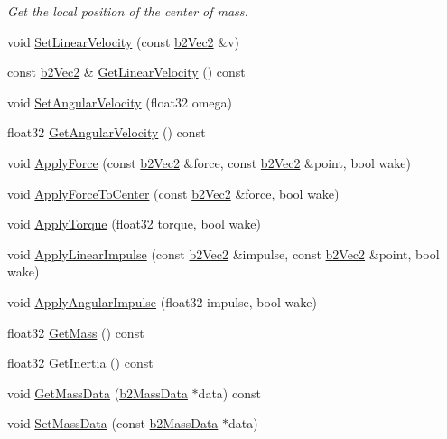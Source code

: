 \begin{DoxyCompactItemize}
\begin{DoxyCompactList}\small\item\em Get the local position of the center of mass. \end{DoxyCompactList}\item 
void \hyperlink{classb2_body_a832f3989a44f0d4782c80456832197ad}{Set\+Linear\+Velocity} (const \hyperlink{structb2_vec2}{b2\+Vec2} \&v)
\item 
const \hyperlink{structb2_vec2}{b2\+Vec2} \& \hyperlink{classb2_body_a427cf835b5d3327a003ff43cb6107ead}{Get\+Linear\+Velocity} () const 
\item 
void \hyperlink{classb2_body_a37adc4160b84f73e8552a91cbde3f578}{Set\+Angular\+Velocity} (float32 omega)
\item 
float32 \hyperlink{classb2_body_a158fe4c141168d2c3e65096b209f548c}{Get\+Angular\+Velocity} () const 
\item 
void \hyperlink{classb2_body_a942be8e1cd2bcd06f53c4638c45a9525}{Apply\+Force} (const \hyperlink{structb2_vec2}{b2\+Vec2} \&force, const \hyperlink{structb2_vec2}{b2\+Vec2} \&point, bool wake)
\item 
void \hyperlink{classb2_body_abeba04911f7a2a141169bb06fe98d06a}{Apply\+Force\+To\+Center} (const \hyperlink{structb2_vec2}{b2\+Vec2} \&force, bool wake)
\item 
void \hyperlink{classb2_body_a54a354447ac3b4cc224c8327a5abc0e8}{Apply\+Torque} (float32 torque, bool wake)
\item 
void \hyperlink{classb2_body_a7f677e93efb3c4c065087aff317274a3}{Apply\+Linear\+Impulse} (const \hyperlink{structb2_vec2}{b2\+Vec2} \&impulse, const \hyperlink{structb2_vec2}{b2\+Vec2} \&point, bool wake)
\item 
void \hyperlink{classb2_body_a65384cfad8db2376cdf3fab38cac06e5}{Apply\+Angular\+Impulse} (float32 impulse, bool wake)
\item 
float32 \hyperlink{classb2_body_a4f62fea4546d2b9ca64a5f6723bbc71c}{Get\+Mass} () const 
\item 
float32 \hyperlink{classb2_body_a8c8916caf67c1e618a07d8b6b9253fa8}{Get\+Inertia} () const 
\item 
void \hyperlink{classb2_body_ad0a90df7e2617a8572cd476267f95417}{Get\+Mass\+Data} (\hyperlink{structb2_mass_data}{b2\+Mass\+Data} $\ast$data) const 
\item 
void \hyperlink{classb2_body_a58a641fedf8a81e1e26d09ec00a22fe2}{Set\+Mass\+Data} (const \hyperlink{structb2_mass_data}{b2\+Mass\+Data} $\ast$data)
\item 

\end{DoxyCompactItemize}
